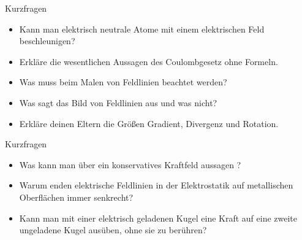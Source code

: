 \begin{frame}{Kurzfragen}
    \begin{itemize}
        \item Kann man elektrisch neutrale Atome mit einem elektrischen Feld beschleunigen?
        \item <2-> Erkläre die wesentlichen Aussagen des Coulombgesetz ohne Formeln.
        \item <3-> Was muss beim Malen von Feldlinien beachtet werden?
        \item <4-> Was sagt das Bild von Feldlinien aus und was nicht?
        \item <5-> Erkläre deinen Eltern die Größen Gradient, Divergenz und Rotation.        
    \end{itemize}    
\end{frame}
\begin{frame}{Kurzfragen}
    \begin{itemize}
        \item Was kann man über ein konservatives Kraftfeld aussagen ?
        \item <2-> Warum enden elektrische Feldlinien in der Elektrostatik auf metallischen Oberflächen immer senkrecht?
        \item <3-> Kann man mit einer elektrisch geladenen Kugel eine Kraft auf eine zweite ungeladene Kugel ausüben, ohne sie zu berühren?
    \end{itemize}
\end{frame}